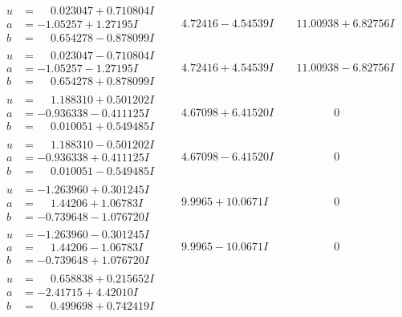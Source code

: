 \documentclass[1p]{elsarticle_modified}
\theoremstyle{definition}
\begin{document}
$$\begin{array}{c|c|c}
\begin{aligned}
u &= \phantom{-}0.023047 + 0.710804 I \\
a &= -1.05257 + 1.27195 I \\
b &= \phantom{-}0.654278 - 0.878099 I\end{aligned}
 & \phantom{-}4.72416 - 4.54539 I & \phantom{-}11.00938 + 6.82756 I \\ \hline\begin{aligned}
u &= \phantom{-}0.023047 - 0.710804 I \\
a &= -1.05257 - 1.27195 I \\
b &= \phantom{-}0.654278 + 0.878099 I\end{aligned}
 & \phantom{-}4.72416 + 4.54539 I & \phantom{-}11.00938 - 6.82756 I \\ \hline\begin{aligned}
u &= \phantom{-}1.188310 + 0.501202 I \\
a &= -0.936338 - 0.411125 I \\
b &= \phantom{-}0.010051 + 0.549485 I\end{aligned}
 & \phantom{-}4.67098 + 6.41520 I & \phantom{-0.000000 } 0 \\ \hline\begin{aligned}
u &= \phantom{-}1.188310 - 0.501202 I \\
a &= -0.936338 + 0.411125 I \\
b &= \phantom{-}0.010051 - 0.549485 I\end{aligned}
 & \phantom{-}4.67098 - 6.41520 I & \phantom{-0.000000 } 0 \\ \hline\begin{aligned}
u &= -1.263960 + 0.301245 I \\
a &= \phantom{-}1.44206 + 1.06783 I \\
b &= -0.739648 - 1.076720 I\end{aligned}
 & \phantom{-}9.9965 + 10.0671 I & \phantom{-0.000000 } 0 \\ \hline\begin{aligned}
u &= -1.263960 - 0.301245 I \\
a &= \phantom{-}1.44206 - 1.06783 I \\
b &= -0.739648 + 1.076720 I\end{aligned}
 & \phantom{-}9.9965 - 10.0671 I & \phantom{-0.000000 } 0 \\ \hline\begin{aligned}
u &= \phantom{-}0.658838 + 0.215652 I \\
a &= -2.41715 + 4.42010 I \\
b &= \phantom{-}0.499698 + 0.742419 I\end{aligned}

\end{array}$$
\end{document}

